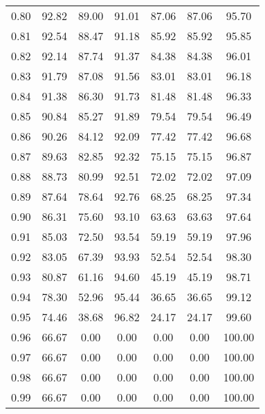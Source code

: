 \begin{tabular}{|c|c|c|c|c|c|c|}
      0.80 &     92.82 &     89.00 &      91.01 &   87.06 &      87.06 &         95.70 \\
      0.81 &     92.54 &     88.47 &      91.18 &   85.92 &      85.92 &         95.85 \\
      0.82 &     92.14 &     87.74 &      91.37 &   84.38 &      84.38 &         96.01 \\
      0.83 &     91.79 &     87.08 &      91.56 &   83.01 &      83.01 &         96.18 \\
      0.84 &     91.38 &     86.30 &      91.73 &   81.48 &      81.48 &         96.33 \\
      0.85 &     90.84 &     85.27 &      91.89 &   79.54 &      79.54 &         96.49 \\
      0.86 &     90.26 &     84.12 &      92.09 &   77.42 &      77.42 &         96.68 \\
      0.87 &     89.63 &     82.85 &      92.32 &   75.15 &      75.15 &         96.87 \\
      0.88 &     88.73 &     80.99 &      92.51 &   72.02 &      72.02 &         97.09 \\
      0.89 &     87.64 &     78.64 &      92.76 &   68.25 &      68.25 &         97.34 \\
      0.90 &     86.31 &     75.60 &      93.10 &   63.63 &      63.63 &         97.64 \\
      0.91 &     85.03 &     72.50 &      93.54 &   59.19 &      59.19 &         97.96 \\
      0.92 &     83.05 &     67.39 &      93.93 &   52.54 &      52.54 &         98.30 \\
      0.93 &     80.87 &     61.16 &      94.60 &   45.19 &      45.19 &         98.71 \\
      0.94 &     78.30 &     52.96 &      95.44 &   36.65 &      36.65 &         99.12 \\
      0.95 &     74.46 &     38.68 &      96.82 &   24.17 &      24.17 &         99.60 \\
      0.96 &     66.67 &      0.00 &       0.00 &    0.00 &       0.00 &        100.00 \\
      0.97 &     66.67 &      0.00 &       0.00 &    0.00 &       0.00 &        100.00 \\
      0.98 &     66.67 &      0.00 &       0.00 &    0.00 &       0.00 &        100.00 \\
      0.99 &     66.67 &      0.00 &       0.00 &    0.00 &       0.00 &        100.00 \\
\bottomrule
\end{tabular}
